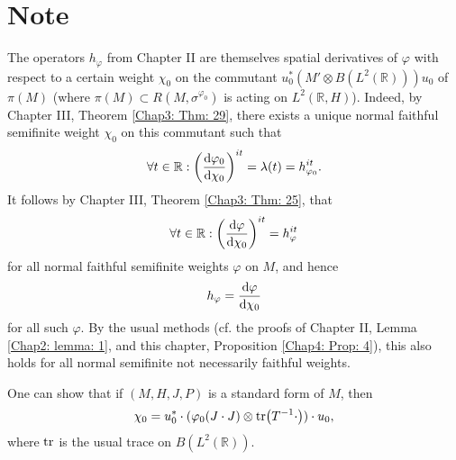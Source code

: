 \section{Note}
The operators $h_\varphi$ from Chapter II are themselves spatial derivatives of $\varphi$ with respect to a certain weight $\chi_0$ on the commutant $u_0^*(M'\otimes B(L^2(\mathbb{R})))u_0$ of $\pi(M)$ (where $\pi(M)\subset R(M,\sigma^{\varphi_0})$ is acting on $L^2(\mathbb{R},H)$). Indeed, by Chapter III, Theorem \ref{Chap3: Thm: 29}, there exists a unique normal faithful semifinite weight $\chi_0$ on this commutant such that
\begin{equation}
    \forall t\in \mathbb{R}:\left( \dv{\varphi_0}{\chi_0} \right)^{it}=\lambda(t)=h_{\varphi_0}^{it}.
\end{equation}
It follows by Chapter III, Theorem \ref{Chap3: Thm: 25}, that
\[
    \forall t\in \mathbb{R}:\left( \dv{\varphi}{\chi_0} \right)^{it}=h_\varphi^{it}
\]
for all normal faithful semifinite weights $\varphi$ on $M$, and hence
\begin{equation}
    h_\varphi=\dv{\varphi}{\chi_0}
\end{equation}
for all such $\varphi$. By the usual methods (cf. the proofs of Chapter II, Lemma \ref{Chap2: lemma: 1}, and this chapter, Proposition \ref{Chap4: Prop: 4}), this also holds for all normal semifinite not necessarily faithful weights.\par
One can show that if $(M,H,J,P)$ is a standard form of $M$, then
\[
    \chi_0=u_0^*\cdot(\varphi_0(J\cdot J)\otimes \tr(T^{-1}\cdot))\cdot u_0,
\]
where $\tr$ is the usual trace on $B(L^2(\mathbb{R}))$.
% 